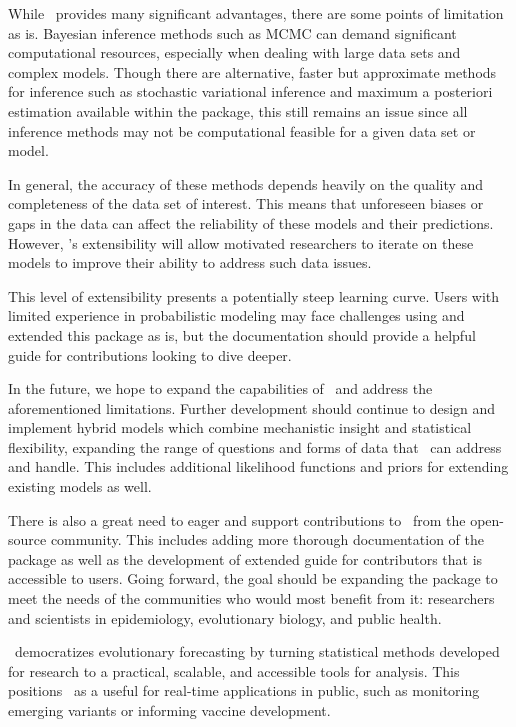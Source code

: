 While \evofr\ provides many significant advantages, there are some points of limitation as is.
Bayesian inference methods such as MCMC can demand significant computational resources, especially when dealing with large data sets and complex models.
  Though there are alternative, faster but approximate methods for inference such as stochastic variational inference and maximum a posteriori estimation available within the package, this still remains an issue since all inference methods may not be computational feasible for a given data set or model.

In general, the accuracy of these methods depends heavily on the quality and completeness of the data set of interest.
This means that unforeseen biases or gaps in the data can affect the reliability of these models and their predictions.
However, \evofr's extensibility will allow motivated researchers to iterate on these models to improve their ability to address such data issues.

This level of extensibility presents a potentially steep learning curve. 
Users with limited experience in probabilistic modeling may face challenges using and extended this package as is, but the documentation should provide a helpful guide for contributions looking to dive deeper.

In the future, we hope to expand the capabilities of \evofr\ and address the aforementioned limitations.
Further development should continue to design and implement hybrid models which combine mechanistic insight and statistical flexibility, expanding the range of questions and forms of data that \evofr\ can address and handle.
This includes additional likelihood functions and priors for extending existing models as well.

There is also a great need to eager and support contributions to \evofr\ from the open-source community.
This includes adding more thorough documentation of the package as well as the development of extended guide for contributors that is accessible to users.
Going forward, the goal should be expanding the package to meet the needs of the communities who would most benefit from it: researchers and scientists in epidemiology, evolutionary biology, and public health.

\evofr\ democratizes evolutionary forecasting by turning statistical methods developed for research to a practical, scalable, and accessible tools for analysis.
This positions \evofr\ as a useful for real-time applications in public, such as monitoring emerging variants or informing vaccine development.

